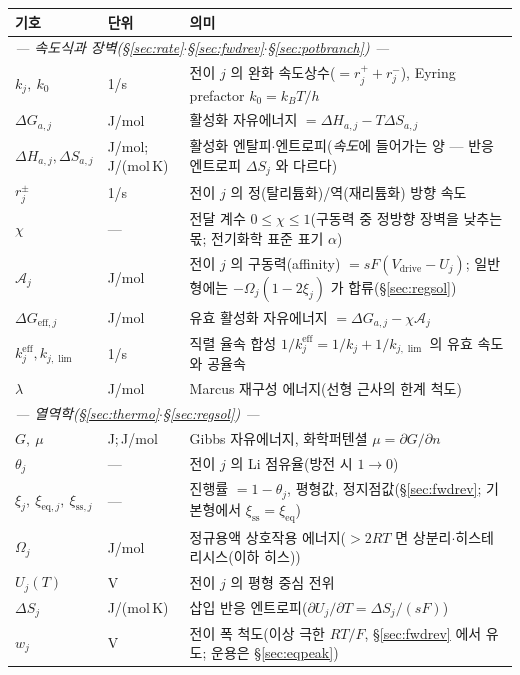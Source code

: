 \documentclass[11pt,a4paper]{article}
\newcommand{\eff}{\mathrm{eff}}
\newcommand{\eq}{\mathrm{eq}}
\newcommand{\drive}{\mathrm{drive}}
\newcommand{\sstat}{\mathrm{ss}}
\begin{document}
\begin{longtable}{p{} p{} p{}}
\toprule 기호 & 단위 & 의미 \\ \midrule \endhead
\multicolumn{3}{l}{\emph{— 속도식과 장벽(\S\ref{sec:rate}$\cdot$\S\ref{sec:fwdrev}$\cdot$\S\ref{sec:potbranch}) —}}\\
$k_j,\ k_0$ & 1/s & 전이 $j$ 의 완화 속도상수($=r_j^++r_j^-$), Eyring prefactor $k_0=k_BT/h$ \\
$\Delta G_{a,j}$ & J/mol & 활성화 자유에너지 $=\Delta H_{a,j}-T\Delta S_{a,j}$ \\
$\Delta H_{a,j},\Delta S_{a,j}$ & {\footnotesize J/mol;\,J/(mol\,K)} & 활성화 엔탈피$\cdot$엔트로피(\emph{속도}에 들어가는 양 — 반응 엔트로피 $\Delta S_j$ 와 다르다) \\
$r_j^\pm$ & 1/s & 전이 $j$ 의 정(탈리튬화)/역(재리튬화) 방향 속도 \\
$\chi$ & --- & 전달 계수 $0\le\chi\le1$(구동력 중 정방향 장벽을 낮추는 몫; 전기화학 표준 표기 $\alpha$) \\
$\mathcal A_j$ & J/mol & 전이 $j$ 의 구동력(affinity) $=sF(V_\drive-U_j)$; 일반형에는 $-\Omega_j(1-2\xi_j)$ 가 합류(\S\ref{sec:regsol}) \\
$\Delta G_{\eff,j}$ & J/mol & 유효 활성화 자유에너지 $=\Delta G_{a,j}-\chi\mathcal A_j$ \\
$k_j^{\eff},k_{j,\lim}$ & 1/s & 직렬 율속 합성 $1/k_j^{\eff}=1/k_j+1/k_{j,\lim}$ 의 유효 속도와 공율속 \\
$\lambda$ & J/mol & Marcus 재구성 에너지(선형 근사의 한계 척도) \\
\multicolumn{3}{l}{\emph{— 열역학(\S\ref{sec:thermo}$\cdot$\S\ref{sec:regsol}) —}}\\
$G,\ \mu$ & J;\,J/mol & Gibbs 자유에너지, 화학퍼텐셜 $\mu=\partial G/\partial n$ \\
$\theta_j$ & --- & 전이 $j$ 의 Li 점유율(방전 시 $1\to0$) \\
$\xi_j,\ \xi_{\eq,j},\ \xi_{\sstat,j}$ & --- & 진행률 $=1-\theta_j$, 평형값, 정지점값(\S\ref{sec:fwdrev}; 기본형에서 $\xi_{\sstat}=\xi_{\eq}$) \\
$\Omega_j$ & J/mol & 정규용액 상호작용 에너지($>2RT$ 면 상분리$\cdot$히스테리시스(이하 히스)) \\
$U_j(T)$ & V & 전이 $j$ 의 평형 중심 전위 \\
$\Delta S_j$ & J/(mol\,K) & 삽입 반응 엔트로피($\partial U_j/\partial T=\Delta S_j/(sF)$) \\
$w_j$ & V & 전이 폭 척도(이상 극한 $RT/F$, \S\ref{sec:fwdrev} 에서 유도; 운용은 \S\ref{sec:eqpeak}) \\

\end{longtable}
\end{document}
